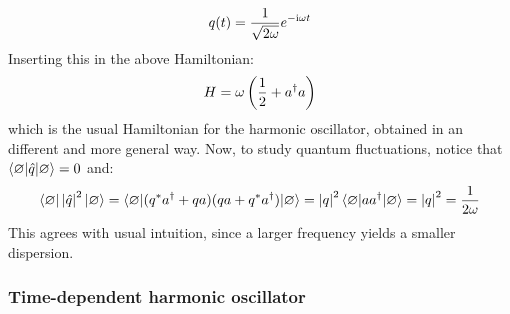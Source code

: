 \begin{equation}
  q(t) = \frac{1}{\sqrt{2\omega}} e^{- \mathrm{i} \omega t}
\end{equation}
Inserting this in the above Hamiltonian:
\begin{equation}
  H = \omega \left( \frac{1}{2} + a^\dagger a \right)
\end{equation}
which is the usual Hamiltonian for the harmonic oscillator, obtained in an different and more general way. Now, to study quantum fluctuations, notice that $ \braket{\varnothing | \hat{q} | \varnothing} = 0 $ and:
\begin{equation*}
  \braket{\varnothing | \left\lvert\hat{q}\right\rvert^2 | \varnothing} = \braket{\varnothing | (q^* a^\dagger + q a) (qa + q^* a^\dagger) | \varnothing} = \left\lvert q\right\rvert^2 \braket{\varnothing | a a^\dagger | \varnothing} = \left\lvert q\right\rvert^2 = \frac{1}{2\omega}
\end{equation*}
This agrees with usual intuition, since a larger frequency yields a smaller dispersion.

\subsubsection{Time-dependent harmonic oscillator}

